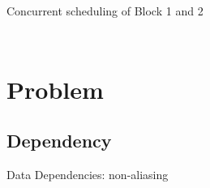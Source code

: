 \documentclass[notes xcolor=dvipsnames]{beamer}
\begin{document}
\begin{frame}{Concurrent scheduling of Block 1 and 2}
\begin{columns}
\begin{column}{0.5\textwidth}
                \begin{figure}
                \end{figure}
                
            \end{column}


        \end{columns}
        
        

    \end{frame}

    \section{Problem}

    \subsection{Dependency}
    \begin{frame}{Data Dependencies: non-aliasing}


        \begin{figure}
        \end{figure}

        \begin{figure}
        \end{figure}
        
    \end{frame}
\end{document}
